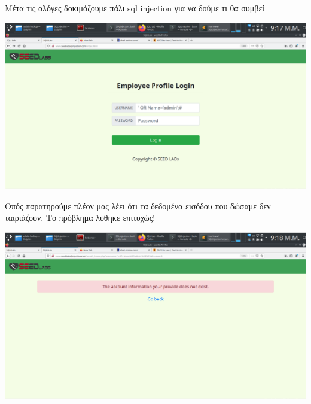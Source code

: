 \noindent
Μέτα τις αλόγες δοκιμάζουμε πάλι sql injection για να δούμε τι θα συμβεί
\begin{center}
			\includegraphics[width=1\textwidth]{image/4.4.PNG}		
\end{center}
\noindent
Οπός παρατηρούμε πλέον μας λέει ότι τα δεδομένα εισόδου που δώσαμε
δεν ταιριάζουν. Το πρόβλημα λύθηκε επιτυχώς!
\begin{center}
			\includegraphics[width=1\textwidth]{image/4.5.PNG}		
\end{center}
